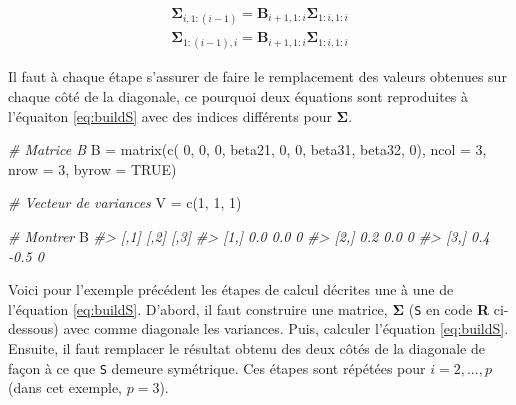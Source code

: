 \documentclass[
]{book}
\newenvironment{Shaded}{}{}
\newcommand{\AttributeTok}[1]{#1}
\newcommand{\CommentTok}[1]{\textit{#1}}
\newcommand{\ConstantTok}[1]{#1}
\newcommand{\DecValTok}[1]{#1}
\newcommand{\FunctionTok}[1]{#1}
\newcommand{\NormalTok}[1]{#1}
\newcommand{\OtherTok}[1]{#1}
\begin{document}
\begin{equation}
\begin{aligned}
\mathbf{\Sigma}_{i,1:(i-1)} = \mathbf{B}_{i+1,1:i}\mathbf{\Sigma}_{1:i,1:i}\\
\mathbf{\Sigma}_{1:(i-1),i} = \mathbf{B}_{i+1,1:i}\mathbf{\Sigma}_{1:i,1:i}
\end{aligned}
\label{eq:buildS}
\end{equation}

Il faut à chaque étape s'assurer de faire le remplacement des valeurs obtenues sur chaque côté de la diagonale, ce pourquoi deux équations sont reproduites à l'équaiton \eqref{eq:buildS} avec des indices différents pour \(\mathbf{\Sigma}\).

\begin{Shaded}
\begin{Highlighting}[]
\CommentTok{\# Matrice B}
\NormalTok{B }\OtherTok{=} \FunctionTok{matrix}\NormalTok{(}\FunctionTok{c}\NormalTok{(   }\DecValTok{0}\NormalTok{,     }\DecValTok{0}\NormalTok{,    }\DecValTok{0}\NormalTok{,}
\NormalTok{             beta21,   }\DecValTok{0}\NormalTok{,    }\DecValTok{0}\NormalTok{,}
\NormalTok{             beta31, beta32, }\DecValTok{0}\NormalTok{), }
           \AttributeTok{ncol  =} \DecValTok{3}\NormalTok{, }\AttributeTok{nrow =} \DecValTok{3}\NormalTok{, }\AttributeTok{byrow =} \ConstantTok{TRUE}\NormalTok{)}

\CommentTok{\# Vecteur de variances}
\NormalTok{V }\OtherTok{=} \FunctionTok{c}\NormalTok{(}\DecValTok{1}\NormalTok{, }\DecValTok{1}\NormalTok{, }\DecValTok{1}\NormalTok{)}

\CommentTok{\# Montrer}
\NormalTok{B}
\CommentTok{\#\textgreater{}      [,1] [,2] [,3]}
\CommentTok{\#\textgreater{} [1,]  0.0  0.0    0}
\CommentTok{\#\textgreater{} [2,]  0.2  0.0    0}
\CommentTok{\#\textgreater{} [3,]  0.4 {-}0.5    0}
\end{Highlighting}
\end{Shaded}

Voici pour l'exemple précédent les étapes de calcul décrites une à une de l'équation \eqref{eq:buildS}. D'abord, il faut construire une matrice, \(\mathbf{\Sigma}\) (\texttt{S} en code \textbf{R} ci-dessous) avec comme diagonale les variances. Puis, calculer l'équation \eqref{eq:buildS}. Ensuite, il faut remplacer le résultat obtenu des deux côtés de la diagonale de façon à ce que \texttt{S} demeure symétrique. Ces étapes sont répétées pour \(i=2,...,p\) (dans cet exemple, \(p=3\)).
\end{document}
